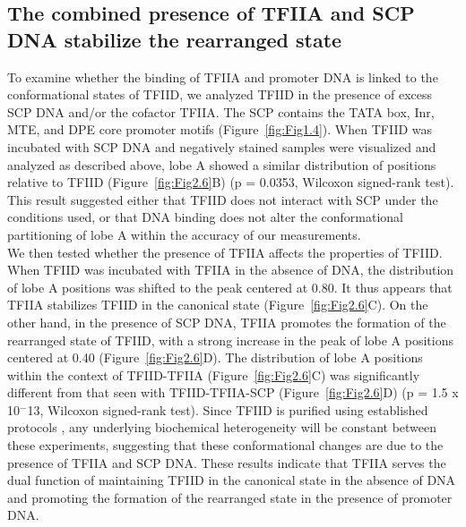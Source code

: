 \subsection{The combined presence of TFIIA and SCP DNA stabilize the rearranged state}
To examine whether the binding of TFIIA and promoter DNA is linked to the conformational states of TFIID, we analyzed TFIID in the presence of excess SCP DNA and/or the cofactor TFIIA. The SCP contains the TATA box, Inr, MTE, and DPE core promoter motifs (Figure~\ref{fig:Fig1.4}). When TFIID was incubated with SCP DNA and negatively stained samples were visualized and analyzed as described above, lobe A showed a similar distribution of positions relative to TFIID (Figure~\ref{fig:Fig2.6}B) (p = 0.0353, Wilcoxon signed-rank test). This result suggested either that TFIID does not interact with SCP under the conditions used, or that DNA binding does not alter the conformational partitioning of lobe A within the accuracy of our measurements.\\
\indent We then tested whether the presence of TFIIA affects the properties of TFIID. When TFIID was incubated with TFIIA in the absence of DNA, the distribution of lobe A positions was shifted to the peak centered at 0.80. It thus appears that TFIIA stabilizes TFIID in the canonical state  (Figure~\ref{fig:Fig2.6}C). On the other hand, in the presence of SCP DNA, TFIIA promotes the formation of the rearranged state of TFIID, with a strong increase in the peak of lobe A positions centered at 0.40  (Figure~\ref{fig:Fig2.6}D). The distribution of lobe A positions within the context of TFIID-TFIIA  (Figure~\ref{fig:Fig2.6}C) was significantly different from that seen with TFIID-TFIIA-SCP  (Figure~\ref{fig:Fig2.6}D) (p = 1.5 x 10$^{-}$13, Wilcoxon signed-rank test). Since TFIID is purified using established protocols \cite{Liu_723,Liu_574}, any underlying biochemical heterogeneity will be constant between these experiments, suggesting that these conformational changes are due to the presence of TFIIA and SCP DNA. These results indicate that TFIIA serves the dual function of maintaining TFIID in the canonical state in the absence of DNA and promoting the formation of the rearranged state in the presence of promoter DNA.\\

